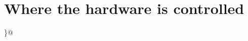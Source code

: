 \hypertarget{group__hardware__control}{}\section{Where the hardware is controlled}
\label{group__hardware__control}
\}@